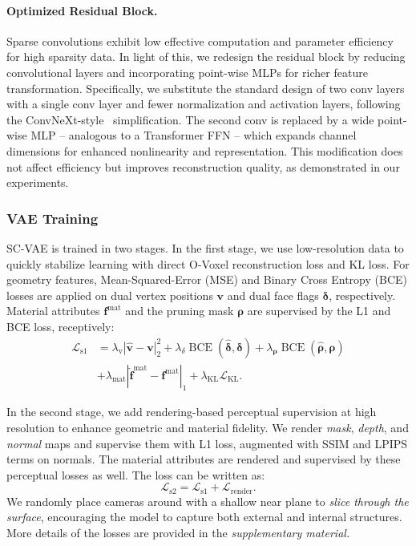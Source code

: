 \documentclass[10pt,twocolumn,letterpaper]{article}
\newcommand{\paravspace}{\vspace{-11pt}}
\begin{document}
\paravspace
\paragraph{Optimized Residual Block.}
Sparse convolutions exhibit low effective computation and parameter efficiency for high sparsity data. In light of this, we redesign the residual block by reducing convolutional layers and incorporating point-wise MLPs for richer feature transformation. Specifically, we substitute the standard design of two conv layers with a single conv layer and fewer normalization and activation layers, following the ConvNeXt-style~\cite{liu2022convnet} simplification. The second conv is replaced by a wide point-wise MLP -- analogous to a Transformer FFN -- which expands  channel dimensions for enhanced nonlinearity and representation. This modification does not affect efficiency but improves reconstruction quality, as demonstrated in our experiments.


\subsubsection{VAE Training}\label{sec:vae_training}

SC-VAE is trained in two stages.
In the first stage, we use low-resolution data to quickly stabilize learning with direct O-Voxel reconstruction loss and KL loss. For geometry features, Mean-Squared-Error (MSE) and Binary Cross Entropy (BCE) losses are applied on dual vertex positions $\boldsymbol{v}$ and dual face flags $\boldsymbol{\delta}$, respectively.
Material attributes $\boldsymbol{f}^{\text{mat}}$ and the pruning mask $\boldsymbol{\rho}$ are supervised by the L1 and BCE loss, receptively:
\begin{equation}
	\begin{split}
		\mathcal{L}_{\text{s1}} &= \lambda_{\text{v}}|\hat{\boldsymbol{v}}-\boldsymbol{v}|_2^2 + \lambda_{\delta}\operatorname{BCE}(\hat{\boldsymbol{\delta}},\boldsymbol{\delta}) + \lambda_{\boldsymbol{\rho}}\operatorname{BCE}(\hat{\boldsymbol{\rho}},\boldsymbol{\rho}) \\
		&+ \lambda_{\text{mat}}|\hat{\boldsymbol{f}}^{\text{mat}} - \boldsymbol{f}^{\text{mat}}|_1 + \lambda_{\text{KL}}\mathcal{L}_{\text{KL}}.
	\end{split}
\end{equation}

\vspace{-3px}
In the second stage, we add rendering-based perceptual supervision at high resolution to enhance geometric and material fidelity.
We render \emph{mask}, \emph{depth}, and \emph{normal} maps and supervise them with L1 loss, augmented with SSIM and LPIPS terms on normals.
The material attributes are rendered and supervised by these perceptual losses as well. The loss can be written as:
\begin{equation}
	\mathcal{L}_{\text{s2}} = \mathcal{L}_{\text{s1}} + \mathcal{L}_{\text{render}}.
\end{equation}
We randomly place cameras around with a shallow near plane to \emph{slice through the surface}, encouraging the model to capture both external and internal structures.
More details of the losses are provided in the \emph{supplementary material.}
\end{document}
